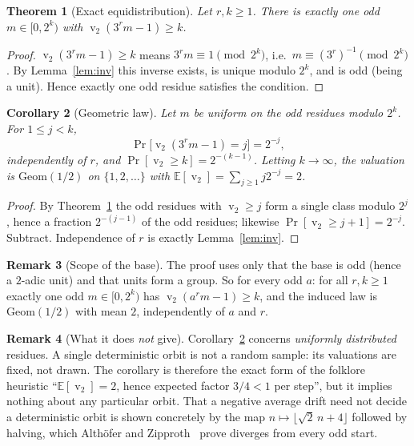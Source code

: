 \documentclass[11pt,a4paper]{article}
\theoremstyle{plain}
\newtheorem{theorem}{Theorem}[section]
\newtheorem{corollary}[theorem]{Corollary}
\theoremstyle{definition}
\newtheorem{remark}[theorem]{Remark}
\newcommand{\val}{\operatorname{v}_2}
\begin{document}
\begin{theorem}[Exact equidistribution]\label{thm:geom}
Let $r,k\ge1$. There is \emph{exactly one} odd $m\in[0,2^{k})$ with $\val(3^{r}m-1)\ge k$.
\end{theorem}
\begin{proof}
$\val(3^{r}m-1)\ge k$ means $3^{r}m\equiv1\pmod{2^{k}}$, i.e.\ $m\equiv(3^{r})^{-1}
\pmod{2^{k}}$. By Lemma~\ref{lem:inv} this inverse exists, is unique modulo $2^{k}$, and is
odd (being a unit). Hence exactly one odd residue satisfies the condition.
\end{proof}

\begin{corollary}[Geometric law]\label{cor:geom}
Let $m$ be uniform on the odd residues modulo $2^{k}$. For $1\le j<k$,
\[
  \Pr\bigl[\val(3^{r}m-1)=j\bigr]=2^{-j},
\]
independently of $r$, and $\Pr[\val\ge k]=2^{-(k-1)}$. Letting $k\to\infty$, the valuation is
$\mathrm{Geom}(1/2)$ on $\{1,2,\dots\}$ with $\mathbb{E}[\val]=\sum_{j\ge1}j2^{-j}=2$.
\end{corollary}
\begin{proof}
By Theorem~\ref{thm:geom} the odd residues with $\val\ge j$ form a single class modulo
$2^{j}$, hence a fraction $2^{-(j-1)}$ of the odd residues; likewise $\Pr[\val\ge j+1]
=2^{-j}$. Subtract. Independence of $r$ is exactly Lemma~\ref{lem:inv}.
\end{proof}

\begin{remark}[Scope of the base]
The proof uses only that the base is odd (hence a $2$-adic unit) and that units form a group.
So for every odd $a$: for all $r,k\ge1$ exactly one odd $m\in[0,2^{k})$ has
$\val(a^{r}m-1)\ge k$, and the induced law is $\mathrm{Geom}(1/2)$ with mean $2$,
independently of $a$ and $r$.
\end{remark}

\begin{remark}[What it does \emph{not} give]\label{rem:scope}
Corollary~\ref{cor:geom} concerns \emph{uniformly distributed} residues. A single
deterministic orbit is not a random sample: its valuations are fixed, not drawn. The
corollary is therefore the exact form of the folklore heuristic ``$\mathbb{E}[\val]=2$, hence
expected factor $3/4<1$ per step'', but it implies nothing about any particular orbit. That a
negative average drift need not decide a deterministic orbit is shown concretely by the map
$n\mapsto\lfloor\sqrt2\,n+4\rfloor$ followed by halving, which Alth\"ofer and
Zipproth~\cite{az} prove diverges from every odd start.
\end{remark}
\end{document}
